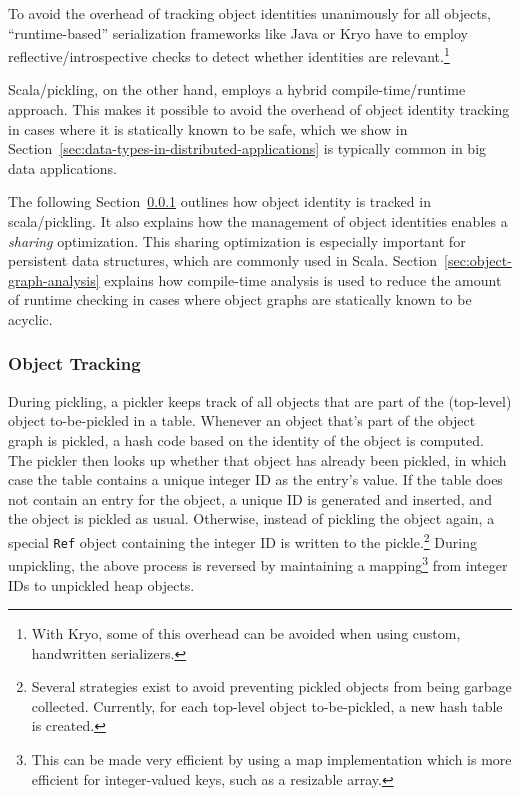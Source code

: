 To avoid the overhead of tracking object identities unanimously for all
objects, ``runtime-based'' serialization frameworks like Java or Kryo have to
employ reflective/introspective checks to detect whether identities are
relevant.\footnote{With Kryo, some of this overhead can be avoided when using custom, handwritten serializers.}

Scala/pickling, on the other hand, employs a hybrid compile-time/runtime
approach. This makes it possible to avoid the overhead of object identity
tracking in cases where it is statically known to be safe, which we show in
Section~\ref{sec:data-types-in-distributed-applications} is typically
common in big data applications.

The following Section~\ref{sec:object-tracking} outlines how object identity
is tracked in scala/pickling. It also explains how the management of object
identities enables a {\em sharing} optimization. This sharing optimization is
especially important for persistent data structures, which are commonly used
in Scala. Section~\ref{sec:object-graph-analysis} explains how compile-time
analysis is used to reduce the amount of runtime checking in cases where
object graphs are statically known to be acyclic.

\subsubsection{Object Tracking}
\label{sec:object-tracking}

During pickling, a pickler keeps track of all objects that are part of the
(top-level) object to-be-pickled in a table. Whenever an object that's part of
the object graph is pickled, a hash code based on the identity of the object
is computed. The pickler then looks up whether that object has already been
pickled, in which case the table contains a unique integer ID as the entry's
value. If the table does not contain an entry for the object, a unique ID is
generated and inserted, and the object is pickled as usual. Otherwise, instead
of pickling the object again, a special \verb|Ref| object containing the integer ID
is written to the pickle.\footnote{Several strategies exist to avoid preventing pickled objects from being garbage collected. Currently, for each top-level object to-be-pickled, a new hash table is created.}
During unpickling, the above process is reversed by maintaining a
mapping\footnote{This can be made very efficient by using a map implementation which is more efficient for integer-valued keys, such as a resizable array.}
from integer IDs to unpickled heap objects.

